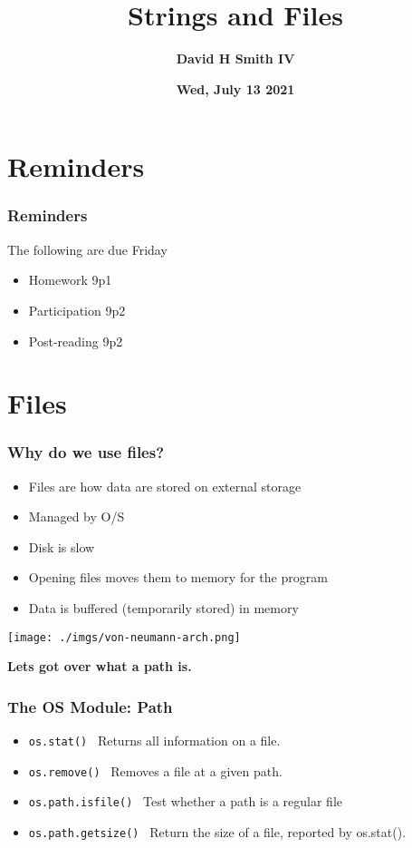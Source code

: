 \documentclass{beamer}
\title{\textbf{Strings and Files}}
\author{\textbf{David H Smith IV}}
\institute[\textbf{UIUC}]{\textbf{University of Illinois Urbana-Champaign}}
\date{\textbf{Wed, July 13 2021}}
\begin{document}
\frame{\titlepage}

\section{Reminders}

%
%
\begin{frame}
  \frametitle{Reminders}
  The following are due Friday
  \begin{itemize}
    \item Homework 9p1
    \item Participation 9p2
    \item Post-reading 9p2
  \end{itemize}
\end{frame}

\section{Files}
%
%
\begin{frame}[fragile]
  \frametitle{Why do we use files?}
  \begin{minipage}{0.48\textwidth}
    \begin{itemize}
      \item Files are how data are stored on external storage
      \item Managed by O/S
      \item Disk is slow
      \item Opening files moves them to memory for the program
      \item Data is buffered (temporarily stored) in memory
    \end{itemize}
  \end{minipage}
  \hfill
  \begin{minipage}{0.48\textwidth}
    \centering
    \texttt{[image: ./imgs/von-neumann-arch.png]}
    \vfill
  \end{minipage}
  \pause
  \vfill
  \textbf{Lets got over what a path is.}
\end{frame}

\begin{frame}[fragile]
  \frametitle{The OS Module: Path}
  \begin{itemize}
    \item \lstinline|os.stat()| \textrightarrow \ Returns all information on a file.
    \item \lstinline|os.remove()| \textrightarrow \ Removes a file at a given path.
    \item \lstinline|os.path.isfile()| \textrightarrow \ Test whether a path is a regular file
    \item \lstinline|os.path.getsize()| \textrightarrow \ Return the size of a file, reported by os.stat().
  \end{itemize}
\end{frame}
\end{document}
